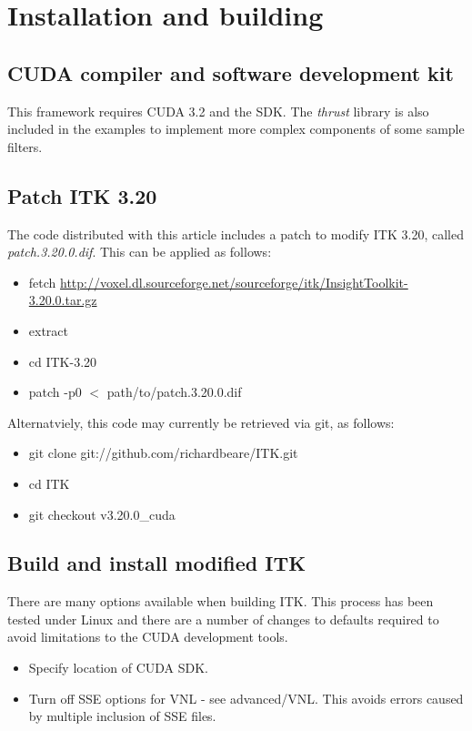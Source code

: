 \documentclass{InsightArticle}
\begin{document}
\section{Installation and building}
\subsection{CUDA compiler and software development kit}
This framework requires CUDA 3.2 and the SDK. The {\em thrust} library
is also included in the examples to implement more complex components
of some sample filters.
\subsection{Patch ITK 3.20}
The code distributed with this article includes a patch to modify ITK
3.20, called {\em patch.3.20.0.dif}. This can be applied as follows:

\begin{itemize}
\item fetch \url{http://voxel.dl.sourceforge.net/sourceforge/itk/InsightToolkit-3.20.0.tar.gz}
\item extract
\item cd ITK-3.20
\item patch -p0 $<$ path/to/patch.3.20.0.dif
\end{itemize}

Alternatviely, this code may currently be retrieved via git, as follows:
\begin{itemize}
\item git clone git://github.com/richardbeare/ITK.git
\item cd ITK
\item git checkout v3.20.0\_cuda
\end{itemize}

\subsection{Build and install modified ITK}
There are many options available when building ITK. This process has
been tested under Linux and there are a number of changes to defaults
required to avoid limitations to the CUDA development tools. 
\begin{itemize}
  \item Specify location of CUDA SDK.
  \item Turn off SSE options for VNL - see advanced/VNL. This avoids errors caused by multiple inclusion of SSE files.
\end{itemize}
\end{document}
